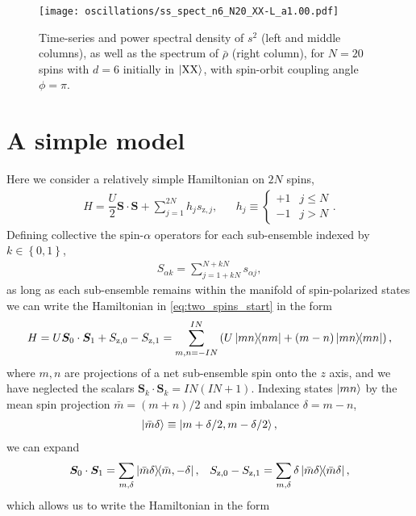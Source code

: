 \documentclass[nofootinbib,notitlepage,11pt]{revtex4-2}
\newcommand{\f}[2]{\dfrac{#1}{#2}} %
\newcommand{\p}[1]{\left(#1\right)} %
\renewcommand{\set}[1]{\left\{#1\right\}} %
\renewcommand{\v}{\bm} %
\renewcommand{\c}{\cdot} %
\newcommand{\1}{\mathds{1}}
\newcommand{\z}{\text{z}}
\newcommand{\X}{\text{X}}
\begin{document}
\begin{figure}
  \centering
  \texttt{[image: oscillations/ss\_spect\_n6\_N20\_XX-L\_a1.00.pdf]}
  \caption{Time-series and power spectral density of $s^2$ (left and middle columns), as well as the spectrum of $\bar\rho$ (right column), for $N=20$ spins with $d=6$ initially in $\ket{\X\X}$, with spin-orbit coupling angle $\phi=\pi$.}
  \label{fig:ss_spect_n6_XX-L_a1.0}
\end{figure}

\section{A simple model}

Here we consider a relatively simple Hamiltonian on $2N$ spins,
\begin{align}
  H = \f{U}{2} \v S\c\v S + \sum_{j=1}^{2N} h_j s_{\z,j},
  &&
  h_j \equiv
  \begin{cases}
    +1 & j \le N \\
    -1 & j > N
  \end{cases}.
  \label{eq:two_spins_start}
\end{align}
Defining collective the spin-$\alpha$ operators for each sub-ensemble indexed by $k\in\set{0,1}$,
\begin{align}
  S_{\alpha k} = \sum_{j=1+kN}^{N+kN} s_{\alpha j},
\end{align}
as long as each sub-ensemble remains within the manifold of spin-polarized states we can write the Hamiltonian in \eqref{eq:two_spins_start} in the form
\begin{align}
  H = U \v S_0 \c\v S_1 + S_{\z,0} - S_{\z,1}
  = \sum_{m,n=-IN}^{IN} \p{U\op{mn}{nm}
    + \p{m-n}\op{mn}},
\end{align}
where $m,n$ are projections of a net sub-ensemble spin onto the $z$ axis, and we have neglected the scalars $\v S_k\cdot \v S_k = IN\p{IN+1}$.
Indexing states $\ket{mn}$ by the mean spin projection $\bar m=\p{m+n}/2$ and spin imbalance $\delta=m-n$,
\begin{align}
  \ket{\bar m\delta} \equiv \ket{m+\delta/2,m-\delta/2},
\end{align}
we can expand
\begin{align}
  \v S_0\c \v S_1 = \sum_{m,\delta}
  \op{\bar m\delta}{\bar m,-\delta},
  &&
  S_{\z,0} - S_{\z,1} = \sum_{m,\delta} \delta \op{\bar m\delta},
\end{align}
which allows us to write the Hamiltonian in the form
\end{document}
